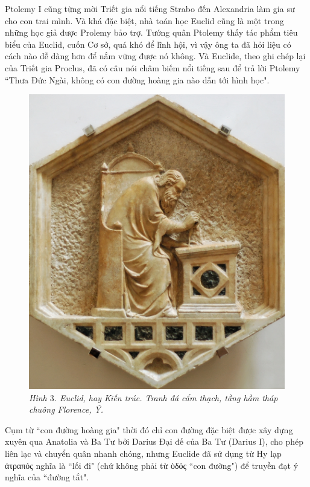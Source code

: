 \begin{multicols}{2}
\begin{figure}[H]
		\vspace*{-12pt}
	\end{figure}
	Ptolemy I cũng  từng mời Triết gia nổi tiếng Strabo đến Alexandria làm gia sư cho con trai mình. Và khá đặc biệt, nhà toán học Euclid cũng là một trong những học giả được Prolemy bảo trợ. Tướng quân Ptolemy thấy tác phẩm tiêu biểu của Euclid, cuốn Cơ sở, quá khó để lĩnh hội, vì vậy ông ta  đã hỏi liệu có cách nào dễ dàng hơn để nắm vững được nó không. Và Euclide, theo ghi chép lại của Triết gia Proclus, đã có câu nói châm biếm nổi tiếng sau để trả lời Ptolemy ``Thưa Đức Ngài, không có con đường hoàng gia nào dẫn tới hình học".
	\begin{figure}[H]
		\vspace*{-5pt}
		\centering
		\captionsetup{labelformat= empty, justification=centering}
		\includegraphics[width= 0.6\linewidth]{4}
		\caption{\small\textit{\color{quantoan}Hình $3$. Euclid, hay Kiến trúc. Tranh đá cẩm thạch, tầng hầm tháp chuông Florence, Ý.}}
		\vspace*{-10pt}
	\end{figure}
	Cụm từ ``con đường hoàng gia" thời đó chỉ  con đường đặc biệt được xây dựng xuyên qua Anatolia và Ba Tư bởi Darius Đại đế của Ba Tư (Darius I), cho phép liên lạc và chuyển quân nhanh chóng, nhưng Euclide đã sử dụng từ Hy lạp  ἀτραπός nghĩa là ``lối đi" (chứ không phải từ ὁδός ``con đường")  để truyền đạt ý nghĩa của ``đường tắt".
	\begin{figure}[H]
		\vspace*{-5pt}
		\centering
		\captionsetup{labelformat= empty, justification=centering}

\end{figure}
\end{multicols}
